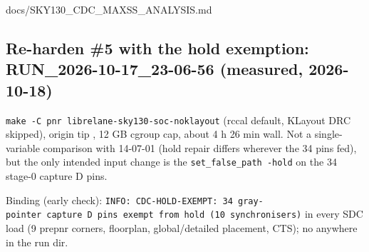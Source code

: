 \begin{relocated}{docs/SKY130_CDC_MAXSS_ANALYSIS.md}
\subsection{\texorpdfstring{Re-harden \#5 with the hold exemption:
RUN\_\allowbreak{}2026-10-17\_\allowbreak{}23-06-56 (measured,
2026-10-18)}{Re-harden \#5 with the hold exemption: RUN\_2026-10-17\_23-06-56 (measured, 2026-10-18)}}\label{tm:pd:sky130-cdc-maxss:8-re-harden-5-with-the-hold-exemption-run-2026-10-17-23-06-56-measured-2026-10-18}

\texttt{make\ -\allowbreak{}C\ pnr\ librelane-\allowbreak{}sky130-\allowbreak{}soc-\allowbreak{}noklayout}
(rccal default, KLayout DRC skipped), origin tip , 12 GB
cgroup cap, about 4 h 26 min wall. Not a single-variable comparison with
14-07-01 (hold repair differs wherever the 34 pins fed), but the only
intended input change is the
\texttt{set\_\allowbreak{}false\_\allowbreak{}path\ -\allowbreak{}hold}
on the 34 stage-0 capture D pins.

Binding (early check):
\texttt{INFO:\allowbreak{}\ CDC-\allowbreak{}HOLD-\allowbreak{}EXEMPT:\allowbreak{}\ 34\ gray-\allowbreak{}pointer\ capture\ D\ pins\ exempt\ from\ hold\ (10\ synchronisers)}
in every SDC load (9 prepnr corners, floorplan,
global/\allowbreak{}detailed placement, CTS); no
 anywhere in the run dir.

{\small\setlength{\tabcolsep}{4pt}

}
\end{relocated}
